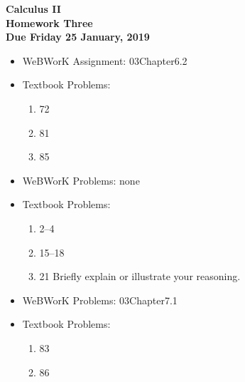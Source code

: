\documentclass[12pt]{article}
\begin{document}
\pagestyle{empty}
 
\begin{center}
{\large {\bf Calculus II}}\\
\medskip
{\large {\bf Homework Three}}\\
\medskip
{ {\bf Due Friday 25 January, 2019}}\\
\end{center}



\begin{itemize}
  \item WeBWorK Assignment: 03Chapter6.2
  \item Textbook Problems:
    \begin{enumerate}
    \setlength{\itemsep}{-1mm}
    \item 72
    \item 81
    \item 85
\end{enumerate}
\end{itemize}




\begin{itemize}
  \item WeBWorK Problems: none
  \item Textbook Problems:
\begin{enumerate}
\setlength{\itemsep}{-1mm}
  \item 2--4
  \item 15--18
  \item 21 Briefly explain or illustrate your reasoning.
\end{enumerate}
\end{itemize}




\begin{itemize}
  \item WeBWorK Problems: 03Chapter7.1
  \item Textbook Problems:
\begin{enumerate}
\setlength{\itemsep}{-1mm}
  \item 83
  \item 86 
\end{enumerate}
\end{itemize}







\end{document}
